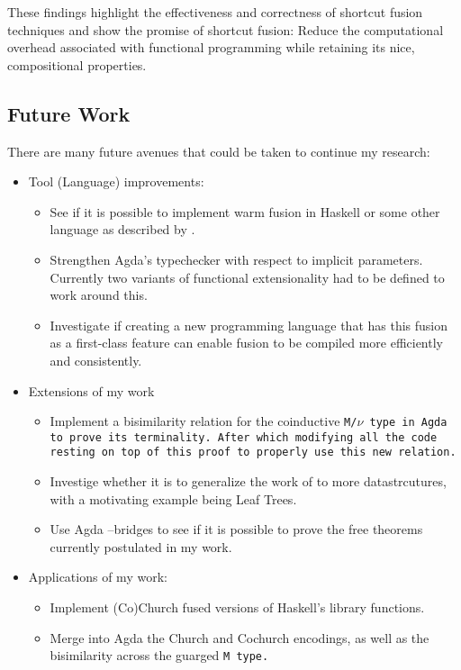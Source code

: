 These findings highlight the effectiveness and correctness of shortcut fusion techniques and show the promise of shortcut fusion: Reduce the computational overhead associated with functional programming while retaining its nice, compositional properties.

\subsection*{Future Work}
There are many future avenues that could be taken to continue my research:
\begin{itemize}[noitemsep]
    \item Tool (Language) improvements:
    \begin{itemize}[nolistsep]
        \item See if it is possible to implement warm fusion in Haskell or some other language as described by \cite{Launchbury1995}.
        \item Strengthen Agda's typechecker with respect to implicit parameters. Currently two variants of functional extensionality had to be defined to work around this.
        \item Investigate if creating a new programming language that has this fusion as a first-class feature can enable fusion to be compiled more efficiently and consistently.
    \end{itemize}
    \item Extensions of my work
    \begin{itemize}[nolistsep]
        \item Implement a bisimilarity relation for the coinductive \tt{M}/$\nu$  type in Agda to prove its terminality. After which modifying all the code resting on top of this proof to properly use this new relation.
        \item Investige whether it is to generalize the work of \cite{Coutts2007} to more datastrcutures, with a motivating example being Leaf Trees.
        \item Use Agda --bridges to see if it is possible to prove the free theorems currently postulated in my work.
    \end{itemize}
    \item Applications of my work:
    \begin{itemize}[nolistsep]
        \item Implement (Co)Church fused versions of Haskell's library functions.
        \item Merge into Agda the Church and Cochurch encodings, as well as the bisimilarity across the guarged \tt{M} type.
    \end{itemize}
\end{itemize}
